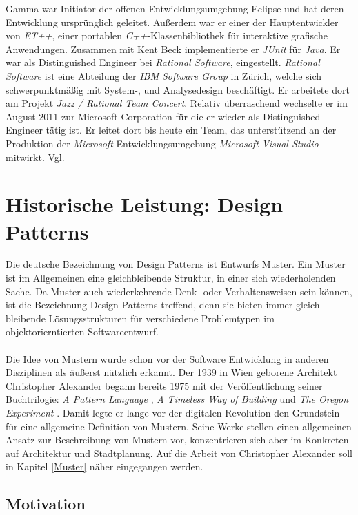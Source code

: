 \documentclass[fontsize=11pt,a4paper,final]{scrreprt}[2003/01/01]
\begin{document}
Gamma war Initiator der offenen Entwicklungsumgebung Eclipse und hat deren Entwicklung ursprünglich geleitet. Außerdem war er einer der Hauptentwickler von \textit{ET++}, einer portablen \textit{C++}-Klassenbibliothek für interaktive grafische Anwendungen. Zusammen mit Kent Beck implementierte er \textit{JUnit} für \textit{Java}. Er war als Distinguished Engineer bei \textit{Rational Software}, eingestellt. \textit{Rational Software} ist eine Abteilung der \textit{IBM Software Group} in Zürich, welche sich schwerpunktmäßig mit System-, und Analysedesign beschäftigt. Er arbeitete dort am Projekt \textit{Jazz / Rational Team Concert}. Relativ überraschend wechselte er im August 2011 zur Microsoft Corporation für die er wieder als Distinguished Engineer tätig ist. Er leitet dort bis heute ein Team, das unterstützend an der Produktion der\textit{ Microsoft}-Entwicklungsumgebung \textit{Microsoft Visual Studio} mitwirkt. Vgl. \cite{ErichGammaWikiDe}

\chapter{Historische Leistung: Design Patterns}\label{se:Historische Leistung: Design Patterns}
Die deutsche Bezeichnung von Design Patterns ist Entwurfs Muster. Ein Muster ist im Allgemeinen eine gleichbleibende Struktur, in einer sich wiederholenden Sache. Da Muster auch wiederkehrende Denk- oder Verhaltensweisen sein können, ist die Bezeichnung Design Patterns treffend, denn sie bieten immer gleich bleibende Lösungsstrukturen für verschiedene Problemtypen im objektorierntierten Softwareentwurf.
\\ \\
Die Idee von Mustern wurde schon vor der Software Entwicklung in anderen Disziplinen als äußerst nützlich erkannt. Der 1939 in Wien geborene Architekt \mbox{Christopher} \mbox{Alexander} begann bereits 1975 mit der Veröffentlichung seiner Buchtrilogie: \textit{A Pattern Language} \cite{Alexander1979}, \textit{A Timeless Way of Building} \cite{Alexander1977} und \textit{The Oregon Experiment} \cite{Alexander1975}. Damit legte er lange vor der digitalen Revolution den Grundstein für eine allgemeine Definition von Mustern. Seine Werke stellen einen allgemeinen Ansatz zur Beschreibung von Mustern vor, konzentrieren sich aber im Konkreten auf Architektur und Stadtplanung. Auf die Arbeit von Christopher Alexander soll in Kapitel \ref{Muster} näher eingegangen werden.

\section{Motivation}\label{se:Motivation}
\end{document}
